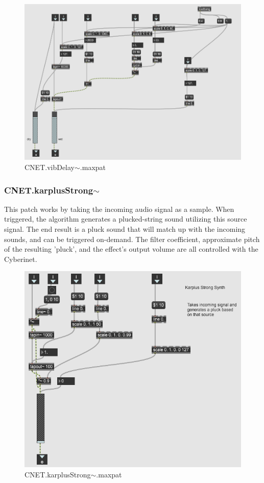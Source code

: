 \begin{figure}
    \centering
    \includegraphics[scale=0.8]{diagrams/maxPatches/CNET.vibDelay~.png}
    \caption{CNET.vibDelay$\sim$.maxpat}
    \label{fig:vibDel}
\end{figure}

\subsubsection{CNET.karplusStrong$\sim$}
This patch works by taking the incoming audio signal as a sample. When triggered, the algorithm generates a plucked-string sound utilizing this source signal. The end result is a pluck sound that will match up with the incoming sounds, and can be triggered on-demand. The filter coefficient, approximate pitch of the resulting 'pluck', and the effect's output volume are all controlled with the Cyberinet.

\begin{figure}
    \centering
    \includegraphics{diagrams/maxPatches/CNET.kStrong.png}
    \caption{CNET.karplusStrong$\sim$.maxpat}
    \label{fig:kstrong}
\end{figure}

